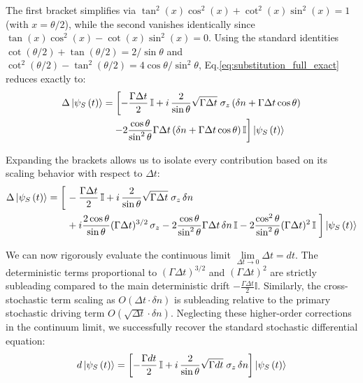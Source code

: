 \documentclass[a4paper,12pt]{article}
\begin{document}
The first bracket simplifies via $\tan^{2}(x)\cos^{2}(x)+\cot^{2}(x)\sin^{2}(x) = 1$ (with $x=\theta/2$), while the second vanishes identically since $\tan (x) \cos^{2}(x) - \cot (x) \sin^{2}(x) = 0$. Using the standard identities $\cot(\theta/2)+\tan(\theta/2) = 2/\sin\theta$ and $\cot^2(\theta/2)-\tan^2(\theta/2) = 4\cos\theta/\sin^2\theta$, Eq.\ref{eq:substitution_full_exact} reduces exactly to:
\begin{align}
	\Delta \ket{\psi_{S}\left(t\right)} &= \left[ -\frac{\Gamma \Delta t}{2} \, \mathbb{I} 
	+ i \, \frac{2}{\sin\theta} \sqrt{\Gamma \Delta t} \; \sigma_{z} \, (\delta n + \Gamma\Delta t \cos\theta) \right. \notag \\
	&\quad\left. - 2\frac{\cos\theta}{\sin^2\theta}\Gamma\Delta t \, (\delta n + \Gamma\Delta t \cos\theta) \, \mathbb{I} \right] \ket{\psi_{S}\left(t\right)}
\end{align}

Expanding the brackets allows us to isolate every contribution based on its scaling behavior with respect to $\Delta t$:
\begin{align}
	\Delta \ket{\psi_{S}\left(t\right)} = \left[ \vphantom{\frac{2}{\sin\theta}} \right. &-\frac{\Gamma \Delta t}{2} \, \mathbb{I} + i \, \frac{2}{\sin\theta} \sqrt{\Gamma \Delta t} \; \sigma_{z} \, \delta n \notag \\
	&+ i \frac{2\cos\theta}{\sin\theta} (\Gamma \Delta t)^{3/2} \, \sigma_{z} - 2\frac{\cos\theta}{\sin^2\theta} \Gamma\Delta t \, \delta n \, \mathbb{I} - 2\frac{\cos^2\theta}{\sin^2\theta} (\Gamma\Delta t)^2 \, \mathbb{I} \left. \vphantom{\frac{2}{\sin\theta}} \right] \ket{\psi_{S}\left(t\right)}
\end{align}

We can now rigorously evaluate the continuous limit $\lim\limits_{\Delta t \rightarrow 0} \Delta t = dt $. The deterministic terms proportional to $(\Gamma\Delta t)^{3/2}$ and $(\Gamma\Delta t)^2$ are strictly subleading compared to the main deterministic drift $-\frac{\Gamma \Delta t}{2}\mathbb{I}$. Similarly, the cross-stochastic term scaling as $O(\Delta t \cdot \delta n)$ is subleading relative to the primary stochastic driving term $O(\sqrt{\Delta t}\cdot\delta n)$. Neglecting these higher-order corrections in the continuum limit, we successfully recover the standard stochastic differential equation:
\begin{equation}
	d\ket{\psi_{S}\left(t\right)} = \left[ -\frac{\Gamma dt}{2} \, \mathbb{I} 
	+ i \, \frac{2}{\sin\theta} \sqrt{\Gamma dt} \; \sigma_{z} \, \delta n \right] \ket{\psi_{S}\left(t\right)}
	\label{eq:substitution_result}
\end{equation}
\end{document}
